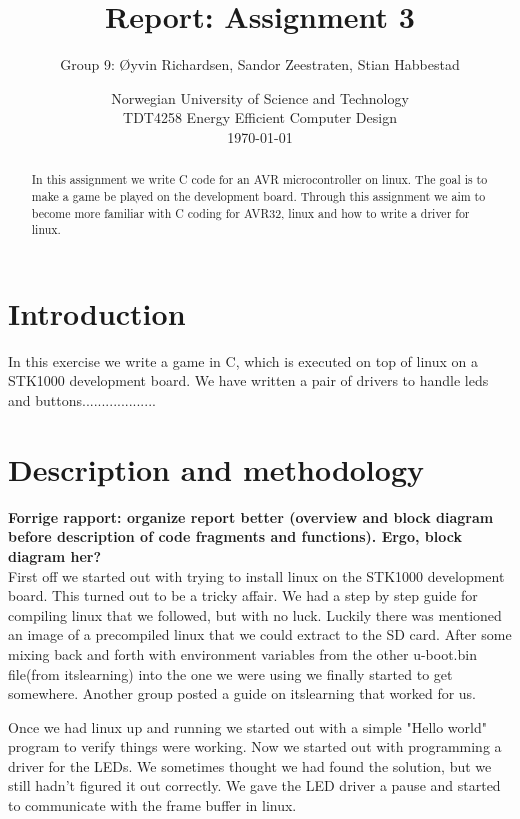 \documentclass[a4paper,11pt]{article}
\title{\textbf{Report: Assignment 3}}
\author{Group 9: \O yvin Richardsen, Sandor Zeestraten, Stian Habbestad}
\date{{Norwegian University of Science and Technology \\
TDT4258 Energy Efficient Computer Design \\}
\today}
\begin{document}
\maketitle

\begin{abstract}
In this assignment we write C code for an AVR microcontroller on linux. The goal is to make a game be played on the development board. Through this assignment we aim to become more familiar with C coding for AVR32, linux and how to write a driver for linux. 
\end{abstract}

\bigskip
\tableofcontents
\newpage

\section{Introduction}

In this exercise we write a game in C, which is executed on top of linux on a STK1000 development board. We have written a pair of drivers to handle leds and buttons...................

\section{Description and methodology}

\textbf{Forrige rapport: organize report better (overview and block diagram before description of code fragments and functions). Ergo, block diagram her?}\\

First off we started out with trying to install linux on the STK1000 development board. This turned out to be a tricky affair. We had a step by step guide for compiling linux that we followed, but with no luck. Luckily there was mentioned an image of a precompiled linux that we could extract to the SD card. After some mixing back and forth with environment variables from the other u-boot.bin file(from itslearning) into the one we were using we finally started to get somewhere. Another group posted a guide on itslearning that worked for us.

Once we had linux up and running we started out with a simple "Hello world" program to verify things were working. Now we started out with programming a driver for the LEDs. We sometimes thought we had found the solution, but we still hadn't figured it out correctly. We gave the LED driver a pause and started to communicate with the frame buffer in linux. 
\end{document}
